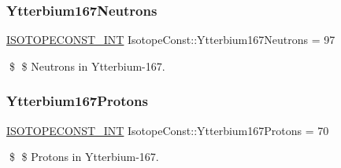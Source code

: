 \subsubsection{\texorpdfstring{Ytterbium167\+Neutrons}{Ytterbium167Neutrons}}
{\footnotesize\ttfamily \mbox{\hyperlink{group___isotope_const-_macros_ga5f18360b3e99483a35c32d789e62621c}{I\+S\+O\+T\+O\+P\+E\+C\+O\+N\+S\+T\+\_\+\+I\+NT}} Isotope\+Const\+::\+Ytterbium167\+Neutrons = 97}

\$ \$ Neutrons in Ytterbium-\/167. \mbox{\label{group___isotope_const-_ytterbium-_yb167_ga77b029f855b1bfeb8c0150441929f47a}} 
\subsubsection{\texorpdfstring{Ytterbium167\+Protons}{Ytterbium167Protons}}
{\footnotesize\ttfamily \mbox{\hyperlink{group___isotope_const-_macros_ga5f18360b3e99483a35c32d789e62621c}{I\+S\+O\+T\+O\+P\+E\+C\+O\+N\+S\+T\+\_\+\+I\+NT}} Isotope\+Const\+::\+Ytterbium167\+Protons = 70}

\$ \$ Protons in Ytterbium-\/167. 
